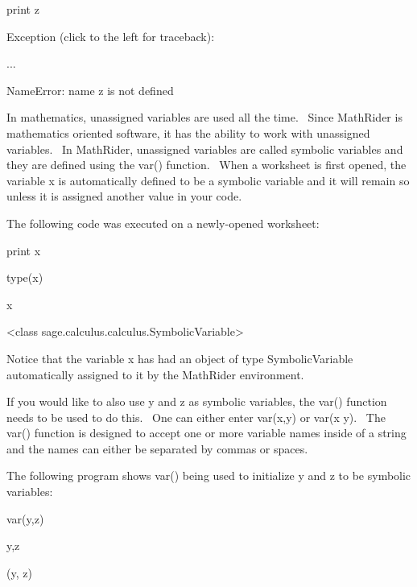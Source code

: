 \documentclass[12pt,twoside]{book}
\begin{document}
\bigskip

print z

{\textbar}

Exception (click to the left for traceback):

...

NameError: name {\textquotesingle}z{\textquotesingle} is not defined


\bigskip

In mathematics, {\textquotedbl}unassigned variables{\textquotedbl} are
used all the time. \ Since MathRider is mathematics oriented software,
it has the ability to work with unassigned variables. \ In MathRider,
unassigned variables are called symbolic variables and they are defined
using the var() function. \ When a worksheet is first opened, the
variable x is automatically defined to be a symbolic variable and it
will remain so unless it is assigned another value in your code.


\bigskip

The following code was executed on a newly{}-opened worksheet:


\bigskip

print x

type(x)

{\textbar}

x

{\textless}class
{\textquotesingle}sage.calculus.calculus.SymbolicVariable{\textquotesingle}{\textgreater}

Notice that the variable x has had an object of type SymbolicVariable
automatically assigned to it by the MathRider environment.


\bigskip

If you would like to also use y and z as symbolic variables, the var()
function needs to be used to do this. \ One can either enter
var({\textquotesingle}x,y{\textquotesingle}) or var({\textquotesingle}x
y{\textquotesingle}). \ The var() function is designed to accept one or
more variable names inside of a string and the names can either be
separated by commas or spaces.


\bigskip

The following program shows var() being used to initialize y and z to be
symbolic variables:


\bigskip

var({\textquotesingle}y,z{\textquotesingle})

y,z

{\textbar}

(y, z)
\end{document}
